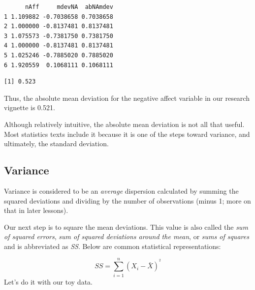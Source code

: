 \documentclass[
  11pt,
]{book}
\newenvironment{Shaded}{\begin{snugshade}}{\end{snugshade}}
\newcommand{\AttributeTok}[1]{\textcolor[rgb]{0.27,0.27,0.27}{#1}}
\newcommand{\CommentTok}[1]{\textcolor[rgb]{0.37,0.37,0.37}{\textit{#1}}}
\newcommand{\ConstantTok}[1]{\textcolor[rgb]{0.37,0.37,0.37}{#1}}
\newcommand{\DecValTok}[1]{\textcolor[rgb]{0.06,0.06,0.06}{#1}}
\newcommand{\FunctionTok}[1]{\textcolor[rgb]{0.27,0.27,0.27}{\textbf{#1}}}
\newcommand{\NormalTok}[1]{#1}
\newcommand{\OtherTok}[1]{\textcolor[rgb]{0.37,0.37,0.37}{#1}}
\newcommand{\SpecialCharTok}[1]{\textcolor[rgb]{0.43,0.43,0.43}{\textbf{#1}}}
\begin{document}
\begin{verbatim}
      nAff     mdevNA  abNAmdev
1 1.109882 -0.7038658 0.7038658
2 1.000000 -0.8137481 0.8137481
3 1.075573 -0.7381750 0.7381750
4 1.000000 -0.8137481 0.8137481
5 1.025246 -0.7885020 0.7885020
6 1.920559  0.1068111 0.1068111
\end{verbatim}

\begin{Shaded}
\end{Shaded}

\begin{verbatim}
[1] 0.523
\end{verbatim}

Thus, the absolute mean deviation for the negative affect variable in our research vignette is 0.521.

Although relatively intuitive, the absolute mean deviation is not all that useful. Most statistics texts include it because it is one of the steps toward variance, and ultimately, the standard deviation.

\hypertarget{variance}{%
\subsection{Variance}\label{variance}}

Variance is considered to be an \emph{average} dispersion calculated by summing the squared deviations and dividing by the number of observations (minus 1; more on that in later lessons).

Our next step is to square the mean deviations. This value is also called the \emph{sum of squared errors}, \emph{sum of squared deviations around the mean}, or \emph{sums of squares} and is abbreviated as \emph{SS}. Below are common statistical representations:

\[SS = \sum_{i=1}^{n}(X_{i} - \bar{X})^{^{2}}\] Let's do it with our toy data.

\begin{Shaded}
\end{Shaded}
\end{document}
